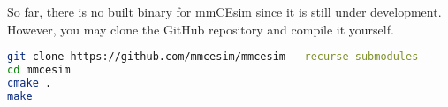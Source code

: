So far, there is no built binary for mmCEsim since it is still under development.
However, you may clone the GitHub repository and compile it yourself.

\begin{lstlisting}[language=sh, morekeywords={git, cmake, make}]
git clone https://github.com/mmcesim/mmcesim --recurse-submodules
cd mmcesim
cmake .
make
\end{lstlisting}
